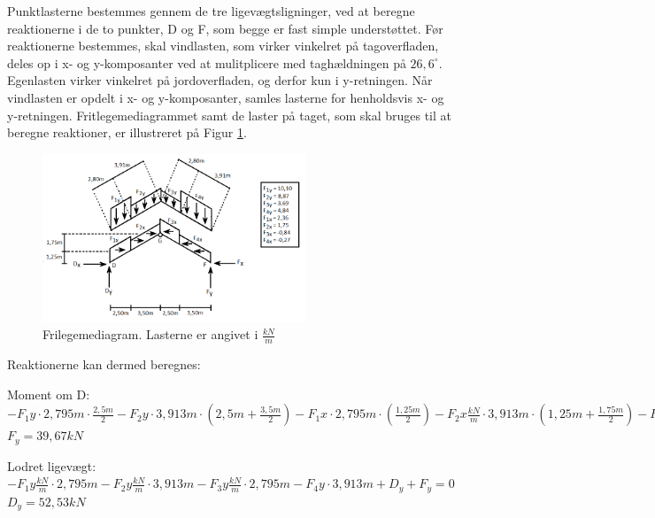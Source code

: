 Punktlasterne bestemmes gennem de tre ligevægtsligninger, ved at beregne reaktionerne i de to punkter, D og F, som begge er fast simple understøttet. Før reaktionerne bestemmes, skal vindlasten, som virker vinkelret på tagoverfladen, deles op i x- og y-komposanter ved at mulitplicere med taghældningen på $26,\!6^\circ$. Egenlasten virker vinkelret på jordoverfladen, og derfor kun i y-retningen. Når vindlasten er opdelt i x- og y-komposanter, samles lasterne for henholdsvis x- og y-retningen. Fritlegemediagrammet samt de laster på taget, som skal bruges til at beregne reaktioner, er illustreret på Figur \ref{fig:fld}. 

\begin{figure}[htbp]
	\centering
	\includegraphics[width=0.7\textwidth]{billeder/fldtag.png}
	\caption{Frilegemediagram. Lasterne er angivet i $\frac{kN}{m}$}
	\label{fig:fld}
\end{figure}

Reaktionerne kan dermed beregnes:
\begin{center}
	Moment om D: $-F_1y \cdot 2,\!795 m \cdot \frac{2,\!5 m}{2} - F_2y \cdot 3,\!913 m \cdot (2,\!5 m + \frac{3,\!5 m}{2}) - F_1x \cdot 2,\!795 m \cdot (\frac{1,\!25 m}{2}) - F_2x \frac{kN}{m} \cdot 3,\!913 m \cdot (1,\!25 m + \frac{1,\!75 m}{2}) - F_3y \cdot 2,\!795 m \cdot (6 m + \frac{2,\!5 m}{2}) - F_4y \frac{kN}{m} \cdot 3,\!913 m \cdot (8,\!5 m + \frac{3,\!5 m}{2}) - F_3x \cdot 2,\!795 m \cdot (1,\!25 m + \frac{1,\!75 m}{2}) - F_4x \cdot 3,\!913 m \cdot (\frac{1,\!25 m}{2}) + 12 m \cdot	F_y = 0$ 
	\newline 
	$F_y = 39,\!67 kN$ 
\end{center}

\begin{center}
	Lodret ligevægt: $-F_1y \frac{kN}{m} \cdot 2,\!795 m - F_2y \frac{kN}{m} \cdot 3,\!913 m - F_3y \frac{kN}{m} \cdot 2,\!795 m -  F_4y \cdot 3,\!913 m + D_y + F_y = 0$ 
	\newline
	$D_y = 52,\!53 kN$
\end{center}

